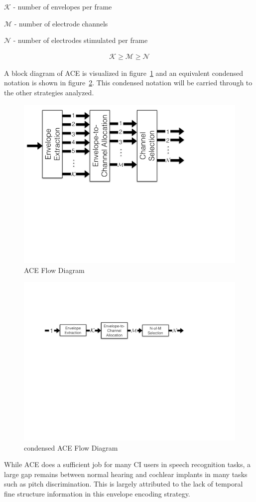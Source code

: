 \documentclass [11pt, proquest,oneside] {ganter_thesis}[2015/03/03]
\begin{document}
$\mathcal{K}$ - number of envelopes per frame

$\mathcal{M}$ - number of electrode channels

$\mathcal{N}$ - number of electrodes stimulated per frame

\begin{align}
\mathcal{K} \geq \mathcal{M} \geq \mathcal{N} \nonumber
\end{align}

A block diagram of ACE is visualized in figure~\ref{fig:ace_flow_diagram} and an equivalent condensed notation is shown in figure~\ref{fig:ace_flow_diagram_condensed}.  This condensed notation will be carried through to the other strategies analyzed.

\begin{figure}[!ht]
  \centering
    \includegraphics[width=.5\textwidth]{ACE_flow_diagram_explicit}   
    \caption{ACE Flow Diagram}\label{fig:ace_flow_diagram}
\end{figure}

\begin{figure}[!ht]
  \centering
    \includegraphics[width=.7\textwidth]{ACE_flow_diagram}   
    \caption{condensed ACE Flow Diagram}\label{fig:ace_flow_diagram_condensed}
\end{figure}

While ACE does a sufficient job for many CI users in speech recognition tasks, a large gap remains between normal hearing and cochlear implants in many tasks such as pitch discrimination.  This is largely attributed to the lack of temporal fine structure information in this envelope encoding strategy.
\end{document}

